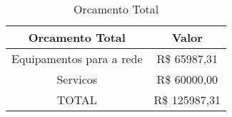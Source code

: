 \begin{table}[h!]
	\centering
	\caption{Orcamento Total}
	\label{tab10} %
\begin{tabular}{|c|c|}
\hline
Orcamento Total          & Valor         \\ \hline
Equipamentos para a rede & R\$ 65987,31  \\ \hline
Servicos                 & R\$ 60000,00  \\ \hline
TOTAL                    & R\$ 125987,31 \\ \hline
\end{tabular}
\end{table}








